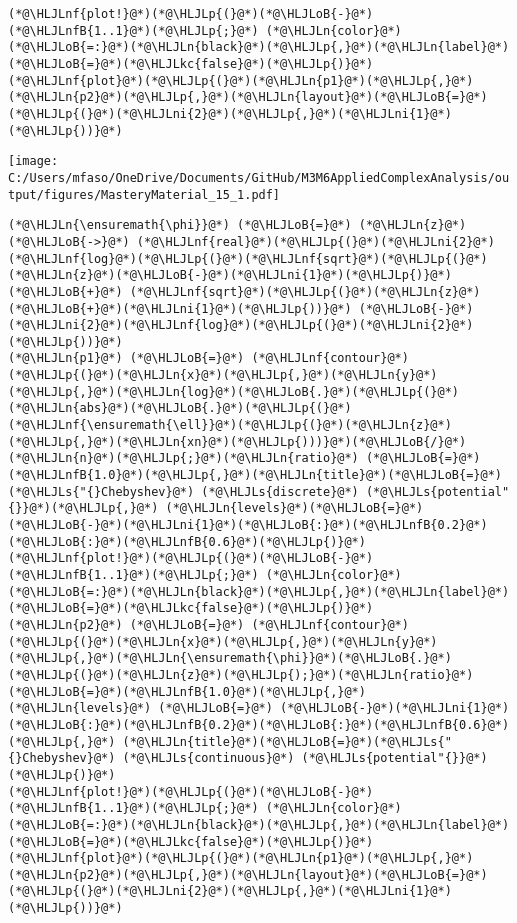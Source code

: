 \documentclass[12pt,a4paper]{article}
\newcommand{\HLJLkc}[1]{\textcolor[RGB]{59,151,46}{\textit{#1}}}
\newcommand{\HLJLn}[1]{#1}
\newcommand{\HLJLnf}[1]{\textcolor[RGB]{66,102,213}{#1}}
\newcommand{\HLJLs}[1]{\textcolor[RGB]{201,61,57}{#1}}
\newcommand{\HLJLnfB}[1]{\textcolor[RGB]{59,151,46}{#1}}
\newcommand{\HLJLni}[1]{\textcolor[RGB]{59,151,46}{#1}}
\newcommand{\HLJLoB}[1]{\textcolor[RGB]{102,102,102}{\textbf{#1}}}
\newcommand{\HLJLp}[1]{#1}
\begin{document}
\begin{lstlisting}
(*@\HLJLnf{plot!}@*)(*@\HLJLp{(}@*)(*@\HLJLoB{-}@*)(*@\HLJLnfB{1..1}@*)(*@\HLJLp{;}@*) (*@\HLJLn{color}@*)(*@\HLJLoB{=:}@*)(*@\HLJLn{black}@*)(*@\HLJLp{,}@*)(*@\HLJLn{label}@*)(*@\HLJLoB{=}@*)(*@\HLJLkc{false}@*)(*@\HLJLp{)}@*)
(*@\HLJLnf{plot}@*)(*@\HLJLp{(}@*)(*@\HLJLn{p1}@*)(*@\HLJLp{,}@*)(*@\HLJLn{p2}@*)(*@\HLJLp{,}@*)(*@\HLJLn{layout}@*)(*@\HLJLoB{=}@*)(*@\HLJLp{(}@*)(*@\HLJLni{2}@*)(*@\HLJLp{,}@*)(*@\HLJLni{1}@*)(*@\HLJLp{))}@*)
\end{lstlisting}

\texttt{[image: C:/Users/mfaso/OneDrive/Documents/GitHub/M3M6AppliedComplexAnalysis/output/figures/MasteryMaterial\_15\_1.pdf]}

\begin{lstlisting}
(*@\HLJLn{\ensuremath{\phi}}@*) (*@\HLJLoB{=}@*) (*@\HLJLn{z}@*) (*@\HLJLoB{->}@*) (*@\HLJLnf{real}@*)(*@\HLJLp{(}@*)(*@\HLJLni{2}@*)(*@\HLJLnf{log}@*)(*@\HLJLp{(}@*)(*@\HLJLnf{sqrt}@*)(*@\HLJLp{(}@*)(*@\HLJLn{z}@*)(*@\HLJLoB{-}@*)(*@\HLJLni{1}@*)(*@\HLJLp{)}@*) (*@\HLJLoB{+}@*) (*@\HLJLnf{sqrt}@*)(*@\HLJLp{(}@*)(*@\HLJLn{z}@*)(*@\HLJLoB{+}@*)(*@\HLJLni{1}@*)(*@\HLJLp{))}@*) (*@\HLJLoB{-}@*) (*@\HLJLni{2}@*)(*@\HLJLnf{log}@*)(*@\HLJLp{(}@*)(*@\HLJLni{2}@*)(*@\HLJLp{))}@*)
(*@\HLJLn{p1}@*) (*@\HLJLoB{=}@*) (*@\HLJLnf{contour}@*)(*@\HLJLp{(}@*)(*@\HLJLn{x}@*)(*@\HLJLp{,}@*)(*@\HLJLn{y}@*)(*@\HLJLp{,}@*)(*@\HLJLn{log}@*)(*@\HLJLoB{.}@*)(*@\HLJLp{(}@*)(*@\HLJLn{abs}@*)(*@\HLJLoB{.}@*)(*@\HLJLp{(}@*)(*@\HLJLnf{\ensuremath{\ell}}@*)(*@\HLJLp{(}@*)(*@\HLJLn{z}@*)(*@\HLJLp{,}@*)(*@\HLJLn{xn}@*)(*@\HLJLp{)))}@*)(*@\HLJLoB{/}@*)(*@\HLJLn{n}@*)(*@\HLJLp{;}@*)(*@\HLJLn{ratio}@*) (*@\HLJLoB{=}@*) (*@\HLJLnfB{1.0}@*)(*@\HLJLp{,}@*)(*@\HLJLn{title}@*)(*@\HLJLoB{=}@*)(*@\HLJLs{"{}Chebyshev}@*) (*@\HLJLs{discrete}@*) (*@\HLJLs{potential"{}}@*)(*@\HLJLp{,}@*) (*@\HLJLn{levels}@*)(*@\HLJLoB{=}@*) (*@\HLJLoB{-}@*)(*@\HLJLni{1}@*)(*@\HLJLoB{:}@*)(*@\HLJLnfB{0.2}@*)(*@\HLJLoB{:}@*)(*@\HLJLnfB{0.6}@*)(*@\HLJLp{)}@*)
(*@\HLJLnf{plot!}@*)(*@\HLJLp{(}@*)(*@\HLJLoB{-}@*)(*@\HLJLnfB{1..1}@*)(*@\HLJLp{;}@*) (*@\HLJLn{color}@*)(*@\HLJLoB{=:}@*)(*@\HLJLn{black}@*)(*@\HLJLp{,}@*)(*@\HLJLn{label}@*)(*@\HLJLoB{=}@*)(*@\HLJLkc{false}@*)(*@\HLJLp{)}@*)
(*@\HLJLn{p2}@*) (*@\HLJLoB{=}@*) (*@\HLJLnf{contour}@*)(*@\HLJLp{(}@*)(*@\HLJLn{x}@*)(*@\HLJLp{,}@*)(*@\HLJLn{y}@*)(*@\HLJLp{,}@*)(*@\HLJLn{\ensuremath{\phi}}@*)(*@\HLJLoB{.}@*)(*@\HLJLp{(}@*)(*@\HLJLn{z}@*)(*@\HLJLp{);}@*)(*@\HLJLn{ratio}@*)(*@\HLJLoB{=}@*)(*@\HLJLnfB{1.0}@*)(*@\HLJLp{,}@*) (*@\HLJLn{levels}@*) (*@\HLJLoB{=}@*) (*@\HLJLoB{-}@*)(*@\HLJLni{1}@*)(*@\HLJLoB{:}@*)(*@\HLJLnfB{0.2}@*)(*@\HLJLoB{:}@*)(*@\HLJLnfB{0.6}@*)(*@\HLJLp{,}@*) (*@\HLJLn{title}@*)(*@\HLJLoB{=}@*)(*@\HLJLs{"{}Chebyshev}@*) (*@\HLJLs{continuous}@*) (*@\HLJLs{potential"{}}@*)(*@\HLJLp{)}@*)
(*@\HLJLnf{plot!}@*)(*@\HLJLp{(}@*)(*@\HLJLoB{-}@*)(*@\HLJLnfB{1..1}@*)(*@\HLJLp{;}@*) (*@\HLJLn{color}@*)(*@\HLJLoB{=:}@*)(*@\HLJLn{black}@*)(*@\HLJLp{,}@*)(*@\HLJLn{label}@*)(*@\HLJLoB{=}@*)(*@\HLJLkc{false}@*)(*@\HLJLp{)}@*)
(*@\HLJLnf{plot}@*)(*@\HLJLp{(}@*)(*@\HLJLn{p1}@*)(*@\HLJLp{,}@*)(*@\HLJLn{p2}@*)(*@\HLJLp{,}@*)(*@\HLJLn{layout}@*)(*@\HLJLoB{=}@*)(*@\HLJLp{(}@*)(*@\HLJLni{2}@*)(*@\HLJLp{,}@*)(*@\HLJLni{1}@*)(*@\HLJLp{))}@*)
\end{lstlisting}
\end{document}

